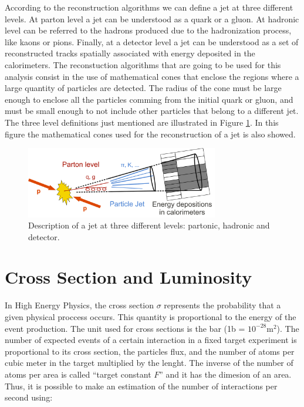  According to the reconstruction algorithms we can define a jet at three different levels. At parton level a jet can be understood as a quark or a gluon. At hadronic level can be referred to the
 hadrons produced due to the hadronization process, like kaons or pions. Finally, at a detector level a jet can be understood as a set of reconstructed tracks spatially associated with energy 
 deposited in the calorimeters. The reconstuction algorithms that are going to be used for this analysis consist in the use of mathematical cones that enclose the regions where a large quantity
 of particles are 
 detected. The radius of the cone must be large enough to enclose all the particles comming from the initial quark or gluon, and must be small enough to not include other particles that belong to a 
 different jet. The three level definitions just mentioned are illustrated in Figure \ref{Jets_definitions}. In this figure the mathematical cones used for the reconstruction of a jet is also showed.
 
 
 \begin{figure}[h] 
 \label{Jets_definitions}
 \centering
 \caption{Description of a jet at three different levels: partonic, hadronic and detector.}
 \includegraphics[width=0.75\textwidth]{./Capitulos/VariableDefinitions/jets_definitions}  
 \end{figure}
 
 \section{Cross Section and Luminosity}
 
 In High Energy Physics, the cross section $\sigma$ represents the probability that a given physical proccess occurs. This quantity is proportional to the energy of the event production. The unit 
 used for cross sections is the bar (1b = $10^{-28} \text{m}^2$). The number of expected events of a certain interaction in a fixed target experiment is proportional to its cross section, the particles flux, and the
 number of atoms per cubic meter in the target multiplied by the lenght. The inverse of the number of atoms per area is called ``target constant $F$'' and it has the dimesion of an area. Thus, it 
 is possible to make an estimation of the number of interactions per second using:
 
